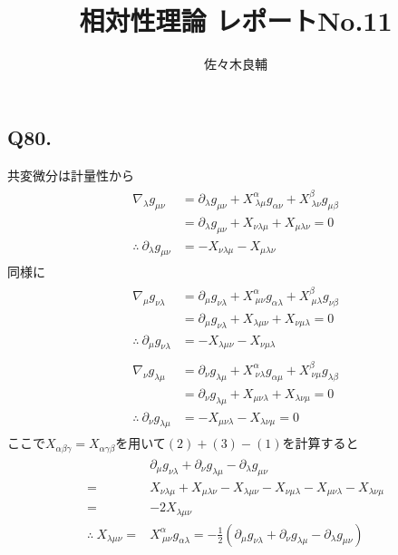 \documentclass[uplatex,a4j,11pt,dvipdfmx]{jsarticle}
\begin{document}
\title{相対性理論 レポートNo.11}
\author{佐々木良輔}
\date{}
\maketitle
\subsection*{Q80.}
共変微分は計量性から
\begin{align}
  \begin{split}
    \nabla_\lambda g_{\mu\nu}&=\partial_\lambda g_{\mu\nu}+X^\alpha_{\ \lambda\mu}g_{\alpha\nu}+X^\beta_{\ \lambda\nu}g_{\mu\beta}\\
    &=\partial_\lambda g_{\mu\nu}+X_{\nu\lambda\mu}+X_{\mu\lambda\nu}=0\\
    \therefore\ \partial_\lambda g_{\mu\nu}&=-X_{\nu\lambda\mu}-X_{\mu\lambda\nu}
  \end{split}
\end{align}
同様に
\begin{align}
  \begin{split}
    \nabla_\mu g_{\nu\lambda}&=\partial_\mu g_{\nu\lambda}+X^\alpha_{\ \mu\nu}g_{\alpha\lambda}+X^\beta_{\ \mu\lambda}g_{\nu\beta}\\
    &=\partial_\mu g_{\nu\lambda}+X_{\lambda\mu\nu}+X_{\nu\mu\lambda}=0\\
    \therefore\ \partial_\mu g_{\nu\lambda}&=-X_{\lambda\mu\nu}-X_{\nu\mu\lambda}
  \end{split}
\end{align}
\begin{align}
  \begin{split}
    \nabla_\nu g_{\lambda\mu}&=\partial_\nu g_{\lambda\mu}+X^\alpha_{\ \nu\lambda}g_{\alpha\mu}+X^\beta_{\ \nu\mu}g_{\lambda\beta}\\
    &=\partial_\nu g_{\lambda\mu}+X_{\mu\nu\lambda}+X_{\lambda\nu\mu}=0\\
    \therefore\ \partial_\nu g_{\lambda\mu}&=-X_{\mu\nu\lambda}-X_{\lambda\nu\mu}=0
  \end{split}
\end{align}
ここで$X_{\alpha\beta\gamma}=X_{\alpha\gamma\beta}$を用いて$(2)+(3)-(1)$を計算すると
\begin{align}
  \begin{split}
    &\partial_\mu g_{\nu\lambda}+\partial_\nu g_{\lambda\mu}-\partial_\lambda g_{\mu\nu}\\
    =&X_{\nu\lambda\mu}+X_{\mu\lambda\nu}-X_{\lambda\mu\nu}-X_{\nu\mu\lambda}-X_{\mu\nu\lambda}-X_{\lambda\nu\mu}\\
    =&-2X_{\lambda\mu\nu}\\
    \therefore\ X_{\lambda\mu\nu}=&X^{\alpha}_{\ \mu\nu}g_{\alpha\lambda}=-\frac{1}{2}(\partial_\mu g_{\nu\lambda}+\partial_\nu g_{\lambda\mu}-\partial_\lambda g_{\mu\nu})
  \end{split}
\end{align}
\end{document}

